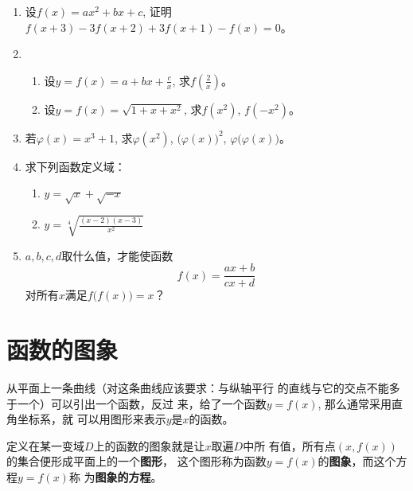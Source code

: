 \begin{enumerate}
\item 设$f(x)=ax^2+bx+c$, 证明
$f(x+3)-3f(x+2)+3f(x+1)-f(x)=0$。
\item \begin{enumerate}
\item 设$y=f(x)=a+bx+\frac{c}{x}$, 求$f\left(\frac{2}{x}\right)$。
\item 设$y=f(x)=\sqrt{1+x+x^2}$, 求$f(x^2)$, $f(-x^2)$。
\end{enumerate}

\item 若$\varphi(x)=x^3+1$, 求$\varphi(x^2)$, $\big(\varphi(x)\big)^2$, $\varphi\big(\varphi(x)\big)$。
\item 求下列函数定义域：
\begin{multicols}{2}
 \begin{enumerate}
    \item $y=\sqrt{x}+\sqrt{-x}$
    \item $y=\sqrt[4]{\frac{(x-2)(x-3)}{x^2}}$
\end{enumerate}   
\end{multicols}

\item $a,b,c,d$取什么值，才能使函数$$f(x)=\frac{ax+b}{cx+d}$$对所有$x$满足$f\big(f(x)\big)=x$？
\end{enumerate}

\section{函数的图象}

从平面上一条曲线（对这条曲线应该要求：与纵轴平行
的直线与它的交点不能多于一个）可以引出一个函数，反过
来，给了一个函数$y=f(x)$, 那么通常采用直角坐标系，就
可以用图形来表示$y$是$x$的函数。

定义在某一变域$D$上的函数的图象就是让$x$取遍$D$中所
有值，所有点$(x,f(x))$的集合便形成平面上的一个\textbf{图形}，
这个图形称为函数$y=f(x)$的\textbf{图象}，而这个方程$y=f(x)$称
为\textbf{图象的方程}。


